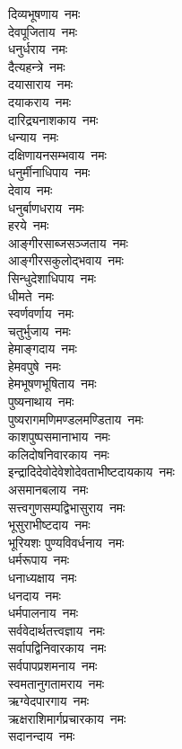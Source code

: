 \begin{flushleft}
\begin{multicols}{2}
दिव्यभूषणाय~नमः\\
देवपूजिताय~नमः\\
धनुर्धराय~नमः\\
दैत्यहन्त्रे~नमः\\
दयासाराय~नमः\\
दयाकराय~नमः\\
दारिद्र्यनाशकाय~नमः\\
धन्याय~नमः\hfill{}\\
दक्षिणायनसम्भवाय~नमः\\
धनुर्मीनाधिपाय~नमः\\
देवाय~नमः\\
धनुर्बाणधराय~नमः\\
हरये~नमः\\
आङ्गीरसाब्जसञ्जताय~नमः\\
आङ्गीरसकुलोद्भवाय~नमः\\
सिन्धुदेशाधिपाय~नमः\\
धीमते~नमः\\
स्वर्णवर्णाय~नमः\hfill{}\\
चतुर्भुजाय~नमः\\
हेमाङ्गदाय~नमः\\
हेमवपुषे~नमः\\
हेमभूषणभूषिताय~नमः\\
पुष्यनाथाय~नमः\\
पुष्यरागमणि\-मण्डल\-मण्डिताय~नमः\\
काशपुष्पसमानाभाय~नमः\\
कलिदोषनिवारकाय~नमः\\
इन्द्रादि\-देवो\-देवेशो\-देवताभीष्ट\-दायकाय~नमः\\
असमानबलाय~नमः\hfill{}\\
सत्त्वगुणसम्पद्विभासुराय~नमः\\
भूसुराभीष्टदाय~नमः\\
भूरियशः पुण्यविवर्धनाय~नमः\\
धर्मरूपाय~नमः\\
धनाध्यक्षाय~नमः\\
धनदाय~नमः\\
धर्मपालनाय~नमः\\
सर्ववेदार्थतत्त्वज्ञाय~नमः\\
सर्वापद्विनिवारकाय~नमः\\
सर्वपापप्रशमनाय~नमः\hfill{}\\
स्वमतानुगतामराय~नमः\\
ऋग्वेदपारगाय~नमः\\
ऋक्षराशिमार्गप्रचारकाय~नमः\\
सदानन्दाय~नमः\\

\end{multicols}
\end{flushleft}
